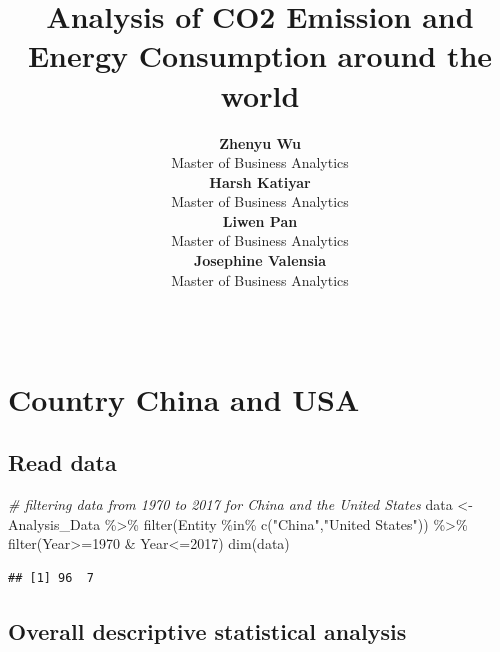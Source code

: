 \documentclass[11pt,a4paper,]{article}
\title{Analysis of CO2 Emission and Energy Consumption around the world}
\author{\sf\Large\textbf{ Zhenyu Wu}\\ {\sf\large Master of Business Analytics\\[0.5cm]} \sf\Large\textbf{ Harsh Katiyar}\\ {\sf\large Master of Business Analytics\\[0.5cm]} \sf\Large\textbf{ Liwen Pan}\\ {\sf\large Master of Business Analytics\\[0.5cm]} \sf\Large\textbf{ Josephine Valensia}\\ {\sf\large Master of Business Analytics\\[0.5cm]}}
\date{\sf\Date~\Month~\Year}
\makeatletter
\newenvironment{Shaded}{\begin{snugshade}}{\end{snugshade}}
\newcommand{\CommentTok}[1]{\textcolor[rgb]{0.56,0.35,0.01}{\textit{#1}}}
\newcommand{\DecValTok}[1]{\textcolor[rgb]{0.00,0.00,0.81}{#1}}
\newcommand{\FunctionTok}[1]{\textcolor[rgb]{0.00,0.00,0.00}{#1}}
\newcommand{\NormalTok}[1]{#1}
\newcommand{\OtherTok}[1]{\textcolor[rgb]{0.56,0.35,0.01}{#1}}
\newcommand{\SpecialCharTok}[1]{\textcolor[rgb]{0.00,0.00,0.00}{#1}}
\newcommand{\StringTok}[1]{\textcolor[rgb]{0.31,0.60,0.02}{#1}}
\def\titlepage{\front{\expandafter{\@title}}{\@author}{\@organization}}
\makeatother
\begin{document}
\titlepage

\section*{Country China and USA}

\hypertarget{read-data}{%
\subsection{Read data}\label{read-data}}

\begin{Shaded}
\begin{Highlighting}[]
\CommentTok{\# filtering data from 1970 to 2017 for China and the United States}
\NormalTok{data }\OtherTok{\textless{}{-}}\NormalTok{ Analysis\_Data }\SpecialCharTok{\%\textgreater{}\%}
  \FunctionTok{filter}\NormalTok{(Entity }\SpecialCharTok{\%in\%} \FunctionTok{c}\NormalTok{(}\StringTok{"China"}\NormalTok{,}\StringTok{"United States"}\NormalTok{)) }\SpecialCharTok{\%\textgreater{}\%}
  \FunctionTok{filter}\NormalTok{(Year}\SpecialCharTok{\textgreater{}=}\DecValTok{1970} \SpecialCharTok{\&}\NormalTok{ Year}\SpecialCharTok{\textless{}=}\DecValTok{2017}\NormalTok{)}
\FunctionTok{dim}\NormalTok{(data)}
\end{Highlighting}
\end{Shaded}

\begin{verbatim}
## [1] 96  7
\end{verbatim}

\hypertarget{overall-descriptive-statistical-analysis}{%
\subsection{Overall descriptive statistical analysis}\label{overall-descriptive-statistical-analysis}}
\end{document}
